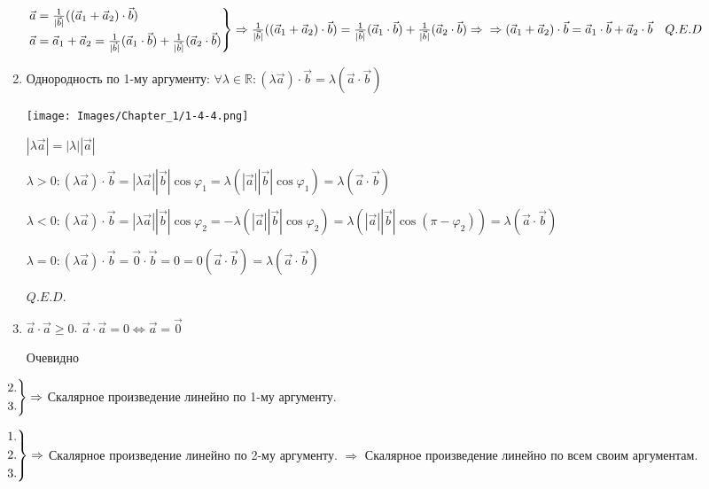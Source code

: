\begin{enumerate}
          \(\begin{rcases*}
              \vec a = \frac{1}{|\vec b|} ((\vec a_1 + \vec a_2) \cdot \vec b) \\
              \vec a = \vec a_1 + \vec a_2 = \frac{1}{|\vec b|} (\vec a_1 \cdot \vec b) + \frac{1}{|\vec b|} (\vec a_2 \cdot \vec b)
          \end{rcases*} \Rightarrow \frac{1}{|\vec b|} ((\vec a_1 + \vec a_2) \cdot \vec b) =
          \frac{1}{|\vec b|} (\vec a_1 \cdot \vec b) + \frac{1}{|\vec b|} (\vec a_2 \cdot \vec b) \Rightarrow \\
          \Rightarrow (\vec a_1 + \vec a_2) \cdot \vec b = \vec a_1 \cdot \vec b + \vec a_2 \cdot \vec b \quad Q.E.D\)
    \item Однородность по 1-му аргументу: \(\forall \lambda \in \mathbb{R}: (\lambda \vec a)\cdot \vec b = \lambda(\vec a \cdot \vec b)\)
          \begin{center}
              \texttt{[image: Images/Chapter\_1/1-4-4.png]}
          \end{center}
          \(|\lambda \vec a| = |\lambda| |\vec a|\)

          \(\lambda > 0: (\lambda \vec a)\cdot \vec b = |\lambda \vec a| |\vec b| \cos\varphi_1 = \lambda(|\vec a| |\vec b| \cos\varphi_1) = \lambda(\vec a \cdot \vec b)\)

          \(\lambda < 0: (\lambda \vec a)\cdot \vec b = |\lambda \vec a| |\vec b| \cos\varphi_2 = -\lambda(|\vec a| |\vec b| \cos\varphi_2) = \lambda(|\vec a| |\vec b| \cos(\pi - \varphi_2)) = \lambda(\vec a \cdot \vec b)\)

          \(\lambda = 0: (\lambda \vec a)\cdot \vec b = \vec 0 \cdot \vec b = 0 = 0(\vec a \cdot \vec b) = \lambda(\vec a \cdot \vec b)\)

          \(Q.E.D.\)
    \item \(\vec a \cdot \vec a \geq 0\). \(\vec a \cdot \vec a = 0 \Leftrightarrow \vec a = \vec 0\)

          Очевидно
\end{enumerate}
\(\begin{rcases*}
    2. \\
    3.
\end{rcases*} \Rightarrow\) Скалярное произведение линейно по 1-му аргументу.

\(\begin{rcases*}
    1. \\
    2. \\
    3.
\end{rcases*} \Rightarrow\) Скалярное произведение линейно по 2-му аргументу. \(\Rightarrow\)
Скалярное произведение линейно по всем своим аргументам.

